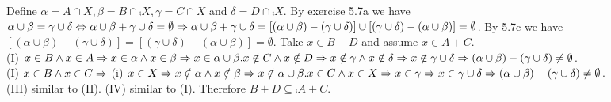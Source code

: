 \documentclass[11pt]{book}
\begin{document}
\begin{enumerate}
{Define $\alpha = A \cap X, \beta = B \cap \comp{X}, \gamma = C \cap X$ and $\delta = D \cap \comp{X}$. By exercise 5.7a we have $\alpha \cup \beta = \gamma \cup \delta \Leftrightarrow \alpha \cup \beta + \gamma \cup \delta = \emptyset \Rightarrow \alpha \cup \beta + \gamma \cup \delta = [(\alpha \cup \beta) - (\gamma \cup \delta)] \cup [(\gamma \cup \delta) - (\alpha \cup \beta)] = \emptyset$. By 5.7c we have $[(\alpha \cup \beta) - (\gamma \cup \delta)] = [(\gamma \cup \delta) - (\alpha \cup \beta)] = \emptyset$. Take $x \in B + D$ and assume $x \in A + C$.\\(I) $x \in B \land x \in A \Rightarrow x \in \alpha \land x \in \beta \Rightarrow x \in \alpha \cup \beta. x \notin C \land x \notin D \Rightarrow x \notin \gamma \land x \notin \delta \Rightarrow x \notin \gamma \cup \delta \Rightarrow (\alpha \cup \beta) - (\gamma \cup \delta) \neq \emptyset$.\\
(I) $x \in B \land x \in C \Rightarrow$ (i) $x \in X \Rightarrow x \notin \alpha \land x \notin \beta \Rightarrow x \notin \alpha \cup \beta. x \in C \land x \in X \Rightarrow x \in \gamma \Rightarrow x \in \gamma \cup \delta \Rightarrow (\alpha \cup \beta) - (\gamma \cup \delta) \neq \emptyset$.\\(III) similar to (II). (IV) similar to (I). Therefore $B + D \subseteq \comp{A+C}$.}
\end{enumerate}

\hrulefill
\end{document}
